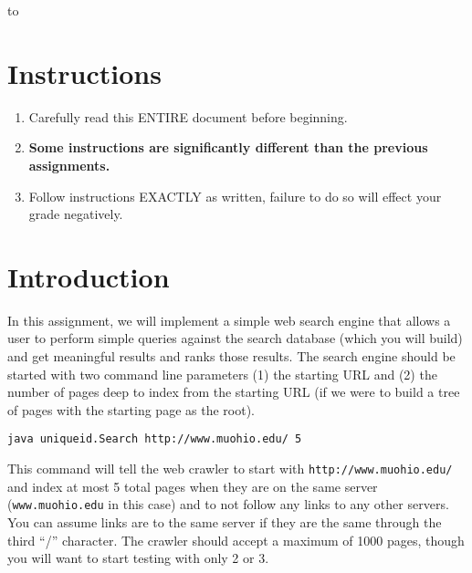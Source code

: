 \documentclass[10pt]{exam}
\begin{document}
\begin{center} 
\end{center} 

\lstset{language=Python,numbers=left}

\vspace{0.1in} 
\hbox to \textwidth{Name:\enspace\hrulefill} 

\section{Instructions}
\begin{enumerate}
   \item Carefully read this ENTIRE document before beginning.
   \item {\bf Some instructions are significantly different than the previous assignments.}
   \item Follow instructions EXACTLY as written, failure to do so will effect your grade negatively.
\end{enumerate}

\section{Introduction}
In this assignment, we will implement a simple web search engine that allows a user to perform simple queries against the search database (which you will build) and get meaningful results and ranks those results.   The search engine should be started with two command line parameters (1) the starting URL and (2) the number of pages deep to index from the starting URL (if we were to build a tree of pages with the starting page as the root).

\begin{verbatim}
java uniqueid.Search http://www.muohio.edu/ 5
\end{verbatim}

This command will tell the web crawler to start with {\tt http://www.muohio.edu/} and index at most 5 total pages when they are on the same server ({\tt www.muohio.edu} in this case) and to not follow any links to any other servers.   You can assume links are to the same server if they are the same through the third ``/'' character.   The crawler should accept a maximum of 1000 pages, though you will want to start testing with only 2 or 3.  
\end{document}
